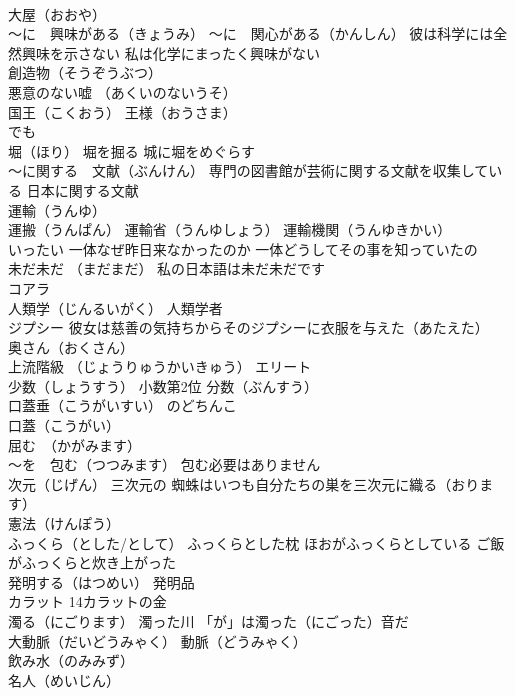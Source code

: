 \documentclass[8pt]{extreport}
\begin{document}
\begin{CJK}{UTF8}{min}
\\	大屋（おおや） 
\\	～に　興味がある（きょうみ） ～に　関心がある（かんしん） 彼は科学には全然興味を示さない 私は化学にまったく興味がない
\\	創造物（そうぞうぶつ）
\\	悪意のない嘘 （あくいのないうそ）
\\	国王（こくおう） 王様（おうさま）
\\	でも
\\	堀（ほり） 堀を掘る 城に堀をめぐらす
\\	～に関する　文献（ぶんけん） 専門の図書館が芸術に関する文献を収集している 日本に関する文献
\\	運輸（うんゆ）
\\	運搬（うんぱん） 運輸省（うんゆしょう） 運輸機関（うんゆきかい）
\\	いったい 一体なぜ昨日来なかったのか 一体どうしてその事を知っていたの
\\	未だ未だ （まだまだ） 私の日本語は未だ未だです
\\	コアラ
\\	人類学（じんるいがく） 人類学者
\\	ジプシー 彼女は慈善の気持ちからそのジプシーに衣服を与えた（あたえた）
\\	奥さん（おくさん）
\\	上流階級 （じょうりゅうかいきゅう） エリート
\\	少数（しょうすう） 小数第2位 分数（ぶんすう）
\\	口蓋垂（こうがいすい） のどちんこ 
\\	口蓋（こうがい）
\\	屈む　（かがみます）
\\	～を　包む（つつみます） 包む必要はありません
\\	次元（じげん） 三次元の 蜘蛛はいつも自分たちの巣を三次元に織る（おります）
\\	憲法（けんぽう）
\\	ふっくら（とした/として） ふっくらとした枕 ほおがふっくらとしている ご飯がふっくらと炊き上がった
\\	発明する（はつめい） 発明品
\\	カラット 14カラットの金
\\	濁る（にごります） 濁った川 「が」は濁った（にごった）音だ
\\	大動脈（だいどうみゃく） 動脈（どうみゃく）
\\	飲み水（のみみず）
\\	名人（めいじん）

\end{CJK}
\end{document}
